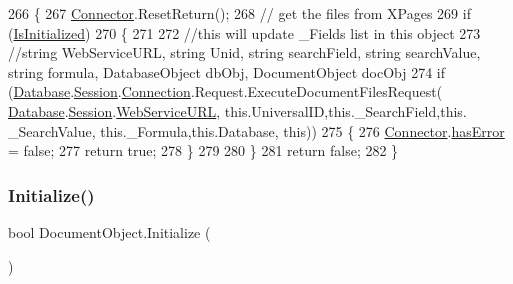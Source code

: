 \begin{DoxyCode}
266     \{
267         \mbox{\hyperlink{class_connector}{Connector}}.ResetReturn();
268         \textcolor{comment}{// get the files from XPages}
269         \textcolor{keywordflow}{if} (\mbox{\hyperlink{class_document_object_a3b2075b73f38d05091b69decc6ce7992}{IsInitialized}})
270         \{
271 
272             \textcolor{comment}{//this will update \_Fields list in this object}
273             \textcolor{comment}{//string WebServiceURL, string Unid, string searchField, string searchValue, string formula,
       DatabaseObject dbObj, DocumentObject docObj}
274             \textcolor{keywordflow}{if} (\mbox{\hyperlink{class_document_object_a69d5338c9835f748490323d2950eed09}{Database}}.\mbox{\hyperlink{class_database_object_aa8484162b7d2a7c4c9426bca13c64c07}{Session}}.\mbox{\hyperlink{class_session_object_a014bdbf705a753540e19bfb53030c55c}{Connection}}.Request.ExecuteDocumentFilesRequest(
      \mbox{\hyperlink{class_document_object_a69d5338c9835f748490323d2950eed09}{Database}}.\mbox{\hyperlink{class_database_object_aa8484162b7d2a7c4c9426bca13c64c07}{Session}}.\mbox{\hyperlink{class_session_object_a697c071c812fbf7ad1166b896fb44c16}{WebServiceURL}}, \textcolor{keyword}{this}.UniversalID,\textcolor{keyword}{this}.\_SearchField,\textcolor{keyword}{this}.
      \_SearchValue, \textcolor{keyword}{this}.\_Formula,\textcolor{keyword}{this}.Database, \textcolor{keyword}{this}))
275             \{
276                 \mbox{\hyperlink{class_connector}{Connector}}.\mbox{\hyperlink{class_connector_a079bae21a5417efa53bfe8954c0f533f}{hasError}} = \textcolor{keyword}{false};
277                 \textcolor{keywordflow}{return} \textcolor{keyword}{true};
278             \}
279 
280         \}
281         \textcolor{keywordflow}{return} \textcolor{keyword}{false};
282     \}
\end{DoxyCode}
\mbox{\label{class_document_object_af4298d6cfbb9ea60643d9995309b73f1}} 
\subsubsection{\texorpdfstring{Initialize()}{Initialize()}}
{\footnotesize\ttfamily bool Document\+Object.\+Initialize (\begin{DoxyParamCaption}{ }\end{DoxyParamCaption})}



